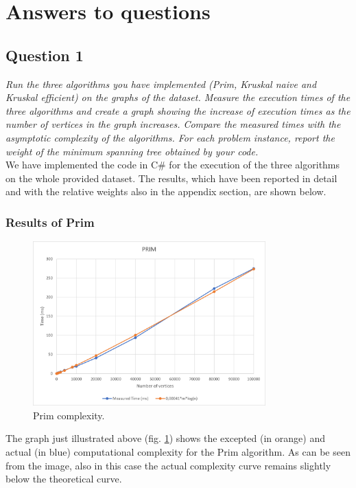\section{Answers to questions}

\subsection{Question 1}
\textit{Run the three algorithms you have implemented (Prim, Kruskal naive and Kruskal efficient) on the graphs of the dataset. Measure the execution times of the three algorithms and create a graph showing the increase of execution times as the number of vertices in the graph increases. Compare the measured times with the asymptotic complexity of the algorithms. For each problem instance, report the weight of the minimum spanning tree obtained by your code.}\\
\noindent
We have implemented the code in C\# for the execution of the three algorithms on the whole provided dataset. The results, which have been reported in detail and with the relative weights also in the appendix section, are shown below.

\subsubsection{Results of Prim}
\begin{figure}[H]
    \centering
    \includegraphics[width=0.8\textwidth]{../img/Prim.png}
    \caption{Prim complexity.}
    \label{fig:prim}
\end{figure}
The graph just illustrated above (fig. \ref{fig:prim}) shows the excepted (in orange) and actual (in blue) computational complexity for the Prim algorithm. As can be seen from the image, also in this case the actual complexity curve remains slightly below the theoretical curve.

